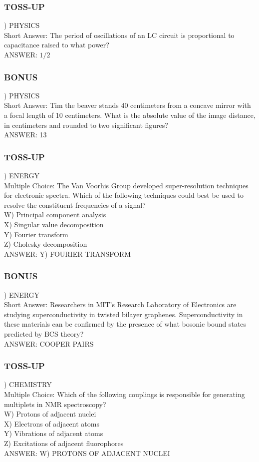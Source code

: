 \documentclass{article}
\begin{document}
\newpage

\subsubsection*{TOSS-UP}
) PHYSICS \\
Short Answer: The period of oscillations of an LC circuit is proportional to capacitance raised to what power? \\
ANSWER: $1/2$

\subsubsection*{BONUS}
) PHYSICS \\
Short Answer: Tim the beaver stands 40 centimeters from a concave mirror with a focal length of 10 centimeters. What is the absolute value of the image distance, in centimeters and rounded to two significant figures? \\
ANSWER: 13

\subsubsection*{TOSS-UP}
) ENERGY \\
Multiple Choice: The Van Voorhis Group developed super-resolution techniques for electronic spectra. Which of the following techniques could best be used to resolve the constituent frequencies of a signal? \\
W) Principal component analysis \\
X) Singular value decomposition \\
Y) Fourier transform \\
Z) Cholesky decomposition \\
ANSWER: Y) FOURIER TRANSFORM

\subsubsection*{BONUS}
) ENERGY \\
Short Answer: Researchers in MIT's Research Laboratory of Electronics are studying superconductivity in twisted bilayer graphenes. Superconductivity in these materials can be confirmed by the presence of what bosonic bound states predicted by BCS theory? \\
ANSWER: COOPER PAIRS

\newpage

\subsubsection*{TOSS-UP}
) CHEMISTRY \\
Multiple Choice: Which of the following couplings is responsible for generating multiplets in NMR spectroscopy? \\
W) Protons of adjacent nuclei \\
X) Electrons of adjacent atoms \\
Y) Vibrations of adjacent atoms \\
Z) Excitations of adjacent fluorophores \\
ANSWER: W) PROTONS OF ADJACENT NUCLEI
\end{document}
